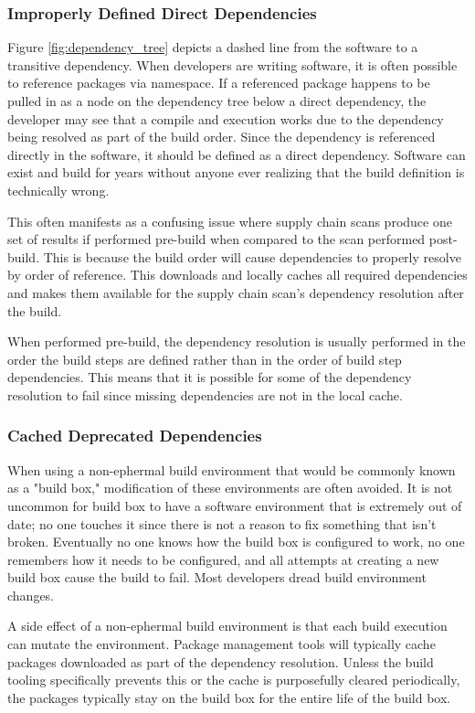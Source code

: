 \subsubsection{Improperly Defined Direct Dependencies}

Figure \ref{fig:dependency_tree} depicts a dashed line from the software to a
transitive dependency.  When developers are writing software, it is often
possible to reference packages via namespace.  If a referenced package happens to be
pulled in as a node on the dependency tree below a direct dependency, the
developer may see that a compile and execution works due to the dependency
being resolved as part of the build order.  Since the dependency
is referenced directly in the software, it should be defined as a direct
dependency.  Software can exist and build for years without anyone ever realizing
that the build definition is technically wrong.

This often manifests as a confusing issue where supply chain scans produce one
set of results if performed pre-build when compared to the scan performed post-build.
This is because the build order will cause dependencies to properly resolve by
order of reference.  This downloads and locally caches all required dependencies
and makes them available for the supply chain scan's dependency resolution after the
build.

When performed pre-build, the dependency resolution is usually performed in the order
the build steps are defined rather than in the order of build step dependencies.  This means
that it is possible for some of the dependency resolution to fail
since missing dependencies are not in the local cache.

\subsubsection{Cached Deprecated Dependencies}

When using a non-ephermal build environment that would be commonly known as a "build box," 
modification of these environments are often avoided.  It is not uncommon for build box
to have a software environment that is extremely out of date; no one touches it 
since there is not a reason to fix something that isn't broken.  Eventually no one
knows how the build box is configured to work, no one remembers how it needs to be configured,
and all attempts at creating a new build box cause the build to fail.  Most developers
dread build environment changes.

A side effect of a non-ephermal build environment is that each build execution can mutate
the environment.  Package management tools will typically cache packages downloaded as part
of the dependency resolution.  Unless the build tooling specifically prevents this or the
cache is purposefully cleared periodically, the packages typically stay on the build box
for the entire life of the build box.

